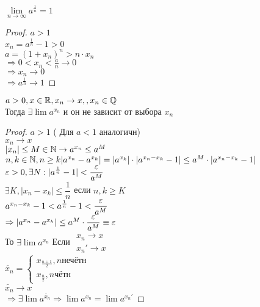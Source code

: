 \begin{definition}
\begin{lemma}
	$ \lim\limits_{n \rightarrow \infty} a^{\frac{1}{n}} = 1$
	\begin{proof}
		$ a > 1 $ \\
		$ x_n = a^{\frac{1}{n}} - 1 > 0 $ \\
		$ a = (1 + x_n)^n > n \cdot x_n $ \\
		$ \Rightarrow 0 < x_n < \frac{a}{n} \rightarrow 0 $  \\
		$ \Rightarrow x_n \rightarrow 0$ \\
		$ \Rightarrow a^{\frac{1}{n}} \rightarrow 1 $ 
	\end{proof}
\end{lemma}
\begin{theorem}
	$ a > 0, x \in \mathbb{R}, x_n \rightarrow x, , x_n \in \mathbb{Q} $ \\
	Тогда $ \exists \lim a^{x_n} $ и он не зависит от выбора $x_n$
	\begin{proof}
		$ a > 1$ ( Для $ a < 1 $ аналогичн) \\
		$ x_n \rightarrow x $ \\
		$ |x_n | \leq M \in \mathbb{N} \rightarrow a^{x_n} \leq a^M $ \\
		$ n, k \in \mathbb{N}, n \geq k | a^{x_n} - a^{x_k} | = |a^{x_k} | \cdot | a^{x_n - x_k} - 1 | \leq a^M \cdot | a^{x_n - x_k} - 1 | $ \\
		$ \varepsilon > 0, \exists N : |a^{\frac{1}{n}} - 1| < \dfrac{\varepsilon}{a^M} $ \\
		$ \exists K, |x_n - x_k | \leq \dfrac{1}{n} $ если $ n, k \geq K $ \\
		$ a^{x_n - x_k } - 1 < a^{\frac{1}{n}} - 1 < \dfrac{\varepsilon}{a^M} $ \\
		$ \Rightarrow |a^{x_n} - a^{x_k} | \leq a^M \cdot \dfrac{\varepsilon}{a^M} \equiv \varepsilon $ \\
		То $ \exists \lim a^{x_n} $ Если  $ \begin{array}{c} x_n \rightarrow x \\ x_n' \rightarrow x \end{array}$ \\
		$ \tilde{x_n} = \left\{ \begin{array}{l}
			x_{\frac{n+1}{2}}, n \text{нечётн} \\
			x_{\frac{n}{2}}, n \text{чётн}
		\end{array} \right. $ \\
		$ \tilde{x_n} \rightarrow x $ \\
		$ \Rightarrow \exists \lim a^{\tilde{x_n}} \Rightarrow \lim a^{x_n} = \lim a^{x_n'} $

\end{proof}
\end{theorem}
\end{definition}
